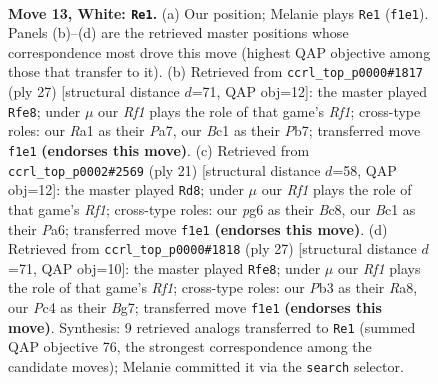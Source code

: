 \documentclass[11pt]{article}
\begin{document}
\clearpage

\begin{figure}[p]\centering
\begin{subfigure}{0.46\textwidth}\centering
\resizebox{\linewidth}{!}{%
\newchessgame
\chessboard[
  setfen={rnb2rk1/1p4b1/4pnp1/p1p2p1p/2P5/1P3NP1/P3PPBP/R1BN1RK1 w - - 0 13},
  showmover=false,
  pgfstyle=straightmove, color=movearrow, markmove={f1-e1}
]}
\caption{}
\end{subfigure}\hfill
\begin{subfigure}{0.46\textwidth}\centering
\resizebox{\linewidth}{!}{%
\newchessgame
\chessboard[
  setfen={r4rk1/ppp2pbp/2np1np1/8/2P5/4PNP1/PP3PBP/R1BR2K1 b - - 5 14},
  showmover=false,
  pgfstyle=straightmove, color=movearrow, markmove={f8-e8}
]}
\caption{}
\end{subfigure}
\\[4pt]
\begin{subfigure}{0.46\textwidth}\centering
\resizebox{\linewidth}{!}{%
\newchessgame
\chessboard[
  setfen={r1b2rk1/1p3ppp/p1n1pn2/2b5/8/1P2PN1P/P3BPP1/RNBR2K1 b - - 0 11},
  showmover=false,
  pgfstyle=straightmove, color=movearrow, markmove={f8-d8}
]}
\caption{}
\end{subfigure}\hfill
\begin{subfigure}{0.46\textwidth}\centering
\resizebox{\linewidth}{!}{%
\newchessgame
\chessboard[
  setfen={r4rk1/ppp2pbp/2np1np1/8/P1P5/4PNP1/1P3PBP/R1B2RK1 b - - 0 14},
  showmover=false,
  pgfstyle=straightmove, color=movearrow, markmove={f8-e8}
]}
\caption{}
\end{subfigure}
\caption{\textbf{Move 13, White: \texttt{Re1}.} (a) Our position; Melanie plays \texttt{Re1} (\texttt{f1e1}). Panels (b)--(d) are the retrieved master positions whose correspondence most drove this move (highest QAP objective among those that transfer to it). (b) Retrieved from \texttt{ccrl\_top\_p0000\#1817} (ply 27) [structural distance $d$=71, QAP obj=12]: the master played \texttt{Rfe8}; under $\mu$ our \emph{Rf1} plays the role of that game's \emph{Rf1}; cross-type roles: our \emph{R}a1 as their \emph{P}a7, our \emph{B}c1 as their \emph{P}b7; transferred move \texttt{f1e1} \textbf{(endorses this move)}. (c) Retrieved from \texttt{ccrl\_top\_p0002\#2569} (ply 21) [structural distance $d$=58, QAP obj=12]: the master played \texttt{Rd8}; under $\mu$ our \emph{Rf1} plays the role of that game's \emph{Rf1}; cross-type roles: our \emph{p}g6 as their \emph{B}c8, our \emph{B}c1 as their \emph{P}a6; transferred move \texttt{f1e1} \textbf{(endorses this move)}. (d) Retrieved from \texttt{ccrl\_top\_p0000\#1818} (ply 27) [structural distance $d$=71, QAP obj=10]: the master played \texttt{Rfe8}; under $\mu$ our \emph{Rf1} plays the role of that game's \emph{Rf1}; cross-type roles: our \emph{P}b3 as their \emph{R}a8, our \emph{P}c4 as their \emph{B}g7; transferred move \texttt{f1e1} \textbf{(endorses this move)}. Synthesis: 9 retrieved analogs transferred to \texttt{Re1} (summed QAP objective 76, the strongest correspondence among the candidate moves); Melanie committed it via the \texttt{search} selector.}
\label{fig:thought-m24}
\end{figure}
\end{document}
